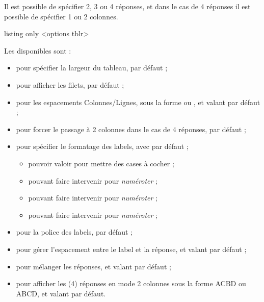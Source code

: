 \documentclass[french,11pt,a4paper]{article}
\begin{document}
\smallskip

Il est possible de spécifier 2, 3 ou 4 réponses, et dans le cas de 4 réponses il est possible de spécifier 1 ou 2 colonnes.

\begin{DemoCode}{listing only}
<options tblr>
\end{DemoCode}

Les  disponibles sont :

\begin{itemize}
	\item {} pour spécifier la largeur du tableau,  par défaut ;
	\item {} pour afficher les filets,  par défaut ;
	\item {} pour les espacements Colonnes/Lignes, sous la forme  ou , et valant \MontreCode{6pt/2pt} par défaut ;
	\item {} pour forcer le passage à 2 colonnes dans le cas de 4 réponses,  par défaut ;
	\item {} pour spécifier le formatage des labels, avec  par défaut ;
	\begin{itemize}
		\item pouvoir valoir  pour mettre des cases à cocher ;
		\item pouvant faire intervenir  pour \textit{numéroter}  ;
		\item pouvant faire intervenir  pour \textit{numéroter}  ;
		\item pouvant faire intervenir  pour \textit{numéroter}  ;
	\end{itemize}
	\item {} pour la police des labels,  par défaut ;
	\item {} pour gérer l'espacement entre le label et la réponse, et valant  par défaut ;
	\item {} pour mélanger les réponses, et valant  par défaut ;
	\item {} pour afficher les (4) réponses en mode 2 colonnes sous la forme ACBD ou ABCD, et valant  par défaut.
\end{itemize}
\end{document}
